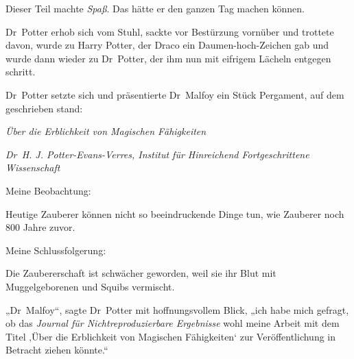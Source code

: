 Dieser Teil machte \emph{Spaß}. Das hätte er den ganzen Tag machen können.

Dr~Potter erhob sich vom Stuhl, sackte vor Bestürzung vornüber und trottete davon, wurde zu Harry Potter, der Draco ein Daumen-hoch-Zeichen gab und wurde dann wieder zu Dr~Potter, der ihm nun mit eifrigem Lächeln entgegen schritt.

Dr~Potter setzte sich und präsentierte Dr~Malfoy ein Stück Pergament, auf dem geschrieben stand:

\begin{center}
\emph{Über die Erblichkeit von Magischen Fähigkeiten}

\emph{Dr~H. J. Potter-Evans-Verres, Institut für Hinreichend Fortgeschrittene Wissenschaft}
\end{center}

\begin{writtenNote}
Meine Beobachtung:

Heutige Zauberer können nicht so beeindruckende Dinge tun, wie Zauberer noch 800 Jahre zuvor.

Meine Schlussfolgerung:

Die Zaubererschaft ist schwächer geworden, weil sie ihr Blut mit Muggelgeborenen und Squibs vermischt.
\end{writtenNote}

„Dr~Malfoy“, sagte Dr~Potter mit hoffnungsvollem Blick, „ich habe mich gefragt, ob das \emph{Journal für Nichtreproduzierbare Ergebnisse} wohl meine Arbeit mit dem Titel ‚Über die Erblichkeit von Magischen Fähigkeiten‘ zur Veröffentlichung in Betracht ziehen könnte.“

